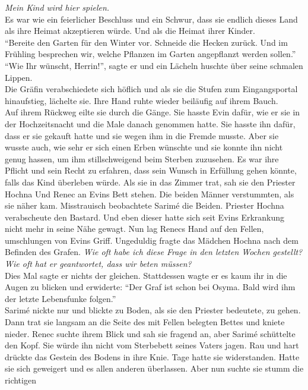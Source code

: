\textit{Mein Kind wird hier spielen.}\\
Es war wie ein feierlicher Beschluss und ein Schwur, dass sie endlich dieses Land als ihre Heimat 
akzeptieren würde. Und als die Heimat ihrer Kinder.\\
``Bereite den Garten für den Winter vor. Schneide die Hecken zurück. Und im Frühling besprechen 
wir, welche Pflanzen im Garten angepflanzt werden sollen.''\\
``Wie Ihr wünscht, Herrin!'', sagte er und ein Lächeln huschte über seine schmalen Lippen.\\
Die Gräfin verabschiedete sich höflich und als sie die Stufen zum Eingangsportal hinaufstieg, 
lächelte sie. Ihre Hand ruhte wieder beiläufig auf ihrem Bauch. \\

Auf ihrem Rückweg eilte sie durch die Gänge. Sie hasste Evin dafür, wie er sie in der 
Hochzeitsnacht und die Male danach genommen hatte. Sie hasste ihn dafür, dass er sie gekauft hatte 
und sie wegen ihm in die Fremde musste. Aber sie wusste auch, wie sehr er sich einen Erben wünschte 
und sie konnte ihn nicht genug hassen, um ihm stillschweigend beim Sterben zuzusehen. Es war ihre 
Pflicht und sein Recht zu erfahren, dass sein Wunsch in Erfüllung gehen könnte, falls das Kind 
überleben würde. Als sie in das Zimmer trat, sah sie den Priester Hochna Und Renec an Evins Bett 
stehen. Die beiden Männer verstummten, als sie näher kam. Misstrauisch beobachtete Sarimé die 
Beiden. Priester Hochna verabscheute den Bastard. Und eben dieser hatte sich seit Evins Erkrankung 
nicht mehr in seine Nähe gewagt. Nun lag Renecs Hand auf den Fellen, umschlungen von Evins Griff.
Ungeduldig fragte das Mädchen Hochna nach dem Befinden des Grafen. 
\textit{Wie oft habe ich diese Frage in den letzten Wochen gestellt? Wie oft hat er geantwortet, 
dass wir beten müssen?}\\
Dies Mal sagte er nichts der gleichen. Stattdessen wagte er es kaum ihr in die Augen zu blicken und 
erwiderte: ``Der Graf ist schon bei Osyma. Bald wird ihm der letzte Lebensfunke folgen.''\\
Sarimé nickte nur und blickte zu Boden, als sie den Priester bedeutete, zu gehen. Dann trat sie 
langsam an die Seite des mit Fellen belegten Bettes und kniete nieder. Renec suchte ihrem Blick und 
sah sie fragend an, aber Sarimé schüttelte den Kopf. Sie würde ihn nicht vom Sterbebett seines 
Vaters jagen. Rau und hart drückte das Gestein des Bodens in ihre Knie. Tage hatte sie widerstanden. 
Hatte sie sich geweigert und es allen anderen überlassen. Aber nun suchte sie stumm die richtigen 
